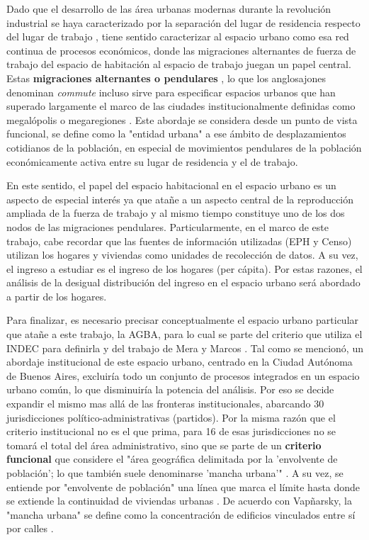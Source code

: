Dado que el desarrollo de las área urbanas modernas durante la revolución industrial se haya caracterizado por la separación del lugar de residencia respecto del lugar de trabajo \cite{vilagrasa, rodriguez}, tiene sentido caracterizar al espacio urbano como esa red continua de procesos económicos, donde las migraciones alternantes de fuerza de trabajo del espacio de habitación al espacio de trabajo juegan un papel central. Estas \textbf{migraciones alternantes o pendulares} \cite{rodriguez,bertoncello,torres1990}, lo que los anglosajones denominan \textit{commute} incluso sirve para especificar espacios urbanos que han superado largamente el marco de las ciudades institucionalmente definidas como megalópolis o megaregiones \cite{dash}. Este abordaje se considera desde un punto de vista funcional, se define como la "entidad urbana" a ese ámbito de desplazamientos cotidianos de la población, en especial de movimientos pendulares de la población económicamente activa entre su lugar de residencia y el de trabajo.

En este sentido, el papel del espacio habitacional en el espacio urbano es un aspecto de especial interés ya que atañe a un aspecto central de la reproducción ampliada de la fuerza de trabajo y al mismo tiempo constituye uno de los dos nodos de las migraciones pendulares. Particularmente, en el marco de este trabajo, cabe recordar que las fuentes de información utilizadas (EPH y Censo) utilizan los hogares y viviendas como unidades de recolección de datos. A su vez, el ingreso a estudiar es el ingreso de los hogares (per cápita). Por estas razones, el análisis de la desigual distribución del ingreso en el espacio urbano será abordado a partir de los hogares.  

Para finalizar, es necesario precisar conceptualmente el espacio urbano particular que atañe a este trabajo, la AGBA, para lo cual se parte del criterio que utiliza el INDEC para definirla y del trabajo de Mera y Marcos \citeyear{meramarcos2012}. Tal como se mencionó, un abordaje institucional de este espacio urbano, centrado en la Ciudad Autónoma de Buenos Aires, excluiría todo un conjunto de procesos integrados en un espacio urbano común, lo que disminuiría la potencia del análisis. Por eso se decide expandir el mismo mas allá de las fronteras institucionales, abarcando 30 jurisdicciones político-administrativas (partidos). Por la misma razón que el criterio institucional no es el que prima, para 16 de esas jurisdicciones no se tomará el total del área administrativo, sino que se parte de un \textbf{criterio funcional} que considere el "área geográfica delimitada por la 'envolvente de población'; lo que también suele denominarse 'mancha urbana'" \cite{indec2003e}. A su vez, se entiende por "envolvente de población" una línea que marca el límite hasta donde se extiende la continuidad de viviendas urbanas \cite{indec2003e}. De acuerdo con Vapñarsky, la "mancha urbana" se define como la concentración de edificios vinculados entre sí por calles \cite{vapniarsky1995,vapniarsky1998}.
 
